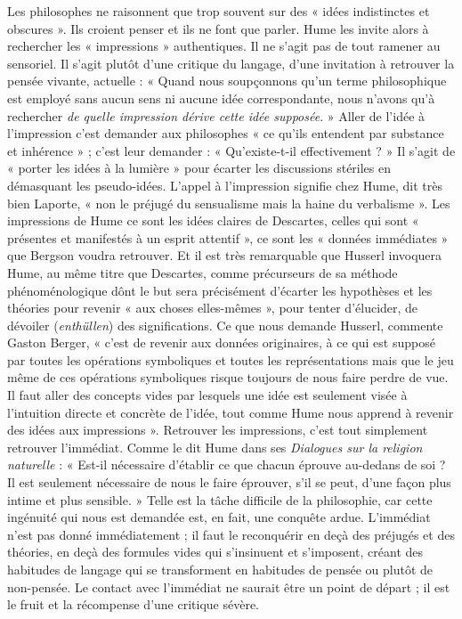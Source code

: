 Les philosophes ne raisonnent que trop souvent sur des
« idées indistinctes et obscures ». Ils croient penser et ils
ne font que parler. Hume les invite alors à rechercher les
« impressions » authentiques. Il ne s’agit pas de tout
ramener au sensoriel. Il s'agit plutôt d'une critique du
langage, d’une invitation à retrouver la pensée vivante,
actuelle : « Quand nous soupçonnons qu’un terme philosophique
est employé sans aucun sens ni aucune idée
correspondante, nous n’avons qu’à rechercher {\it de quelle
impression dérive cette idée supposée}. » Aller de l’idée à
l'impression c’est demander aux philosophes « ce qu’ils
entendent par substance et inhérence » ; c’est leur demander :
« Qu’existe-t-il effectivement ? » Il s’agit de « porter
les idées à la lumière » pour écarter les discussions stériles
en démasquant les pseudo-idées. L'appel à l’impression
signifie chez Hume, dit très bien Laporte, « non le préjugé
du sensualisme mais la haine du verbalisme ». Les impressions
de Hume ce sont les idées claires de Descartes, celles
qui sont « présentes et manifestés à un esprit attentif »,
ce sont les « données immédiates » que Bergson voudra
retrouver. Et il est très remarquable que Husserl invoquera
Hume, au même titre que Descartes, comme précurseurs
de sa méthode phénoménologique dônt le but sera précisément d’écarter les hypothèses et les théories pour
revenir « aux choses elles-mêmes », pour tenter d’élucider,
de dévoiler ({\it enthüllen}) des significations. Ce que nous
demande Husserl, commente Gaston Berger, « c’est de
revenir aux données originaires, à ce qui est supposé par
toutes les opérations symboliques et toutes les représentations mais que le jeu même de ces opérations symboliques
risque toujours de nous faire perdre de vue. Il faut aller
des concepts vides par lesquels une idée est seulement
visée à l’intuition directe et concrète de l’idée, tout comme
Hume nous apprend à revenir des idées aux impressions ».
Retrouver les impressions, c’est tout simplement retrouver l’immédiat.
Comme le dit Hume dans ses {\it Dialogues
sur la religion naturelle} : « Est-il nécessaire d’établir ce
que chacun éprouve au-dedans de soi ? Il est seulement
nécessaire de nous le faire éprouver, s’il se peut, d’une
façon plus intime et plus sensible. » Telle est la tâche difficile de la philosophie, car cette ingénuité qui nous est
demandée est, en fait, une conquête ardue. L’immédiat
n’est pas donné immédiatement ; il faut le reconquérir
en deçà des préjugés et des théories, en deçà des formules
vides qui s’insinuent et s'imposent, créant des habitudes
de langage qui se transforment en habitudes de pensée ou
plutôt de non-pensée. Le contact avec l'immédiat ne saurait
être un point de départ ; il est le fruit et la récompense
d’une critique sévère.
